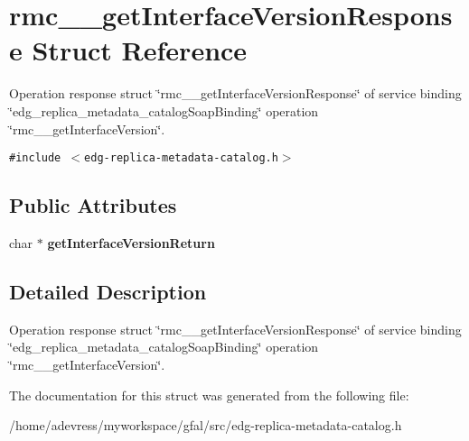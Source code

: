 \section{rmc\_\-\_\-get\-Interface\-Version\-Response Struct Reference}
\label{structrmc____getInterfaceVersionResponse}
Operation response struct \char`\"{}rmc\_\-\_\-get\-Interface\-Version\-Response\char`\"{} of service binding \char`\"{}edg\_\-replica\_\-metadata\_\-catalog\-Soap\-Binding\char`\"{} operation \char`\"{}rmc\_\-\_\-get\-Interface\-Version\char`\"{}.  


{\tt \#include $<$edg-replica-metadata-catalog.h$>$}

\subsection*{Public Attributes}
\begin{CompactItemize}
\item 
char $\ast$ \textbf{get\-Interface\-Version\-Return}\label{structrmc____getInterfaceVersionResponse_fe1851c2b0b2f5182fc7f9ed84b5b96a}

\end{CompactItemize}


\subsection{Detailed Description}
Operation response struct \char`\"{}rmc\_\-\_\-get\-Interface\-Version\-Response\char`\"{} of service binding \char`\"{}edg\_\-replica\_\-metadata\_\-catalog\-Soap\-Binding\char`\"{} operation \char`\"{}rmc\_\-\_\-get\-Interface\-Version\char`\"{}. 



The documentation for this struct was generated from the following file:\begin{CompactItemize}
\item 
/home/adevress/myworkspace/gfal/src/edg-replica-metadata-catalog.h\end{CompactItemize}
